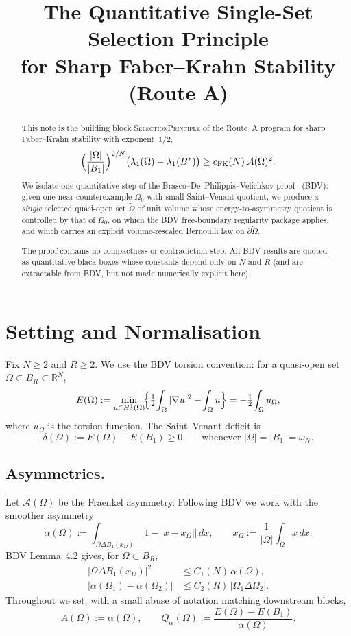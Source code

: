 \documentclass[11pt]{article}
\title{The Quantitative Single-Set Selection Principle\\for Sharp Faber--Krahn Stability (Route A)}
\author{}
\date{}
\theoremstyle{definition}
\newcommand{\R}{\mathbb{R}}
\newcommand{\wt}{\widetilde}
\newcommand{\Om}{\Omega}
\newcommand{\dx}{\,dx}
\begin{document}
\maketitle

\begin{abstract}
This note is the building block \textsc{SelectionPrinciple} of the Route~A
program for sharp Faber--Krahn stability with exponent~$1/2$,
\[
\Bigl(\frac{|\Om|}{|B_1|}\Bigr)^{2/N}
\bigl(\lambda_1(\Om)-\lambda_1(B^*)\bigr)
\ge c_{\rm FK}(N)\,\mathcal A(\Om)^2.
\]
We isolate one quantitative step of the Brasco--De~Philippis--Velichkov
proof~\cite{BDV} (BDV): given one near-counterexample $\Om_0$ with small
Saint--Venant quotient, we produce a \emph{single} selected quasi-open set
$\wt\Om$ of unit volume whose energy-to-asymmetry quotient is controlled by
that of $\Om_0$, on which the BDV free-boundary regularity package applies,
and which carries an explicit volume-rescaled Bernoulli law on
$\partial\wt\Om$.

The proof contains no compactness or contradiction step. All BDV results
are quoted as quantitative black boxes whose constants depend only on $N$
and $R$ (and are extractable from BDV, but not made numerically explicit
here).
\end{abstract}

\section{Setting and Normalisation}

Fix $N\ge2$ and $R\ge2$. We use the BDV torsion convention: for a
quasi-open set $\Om\subset B_R\subset\R^N$,
\[
E(\Om)
:=\min_{u\in H^1_0(\Om)}\!
\Bigl\{\tfrac12\!\int_\Om|\nabla u|^2-\!\int_\Om u\Bigr\}
=-\tfrac12\!\int_\Om u_\Om,
\]
where $u_\Om$ is the torsion function. The Saint--Venant deficit is
\[
\delta(\Om):=E(\Om)-E(B_1)\ge0
\qquad\text{whenever }|\Om|=|B_1|=\omega_N.
\]

\subsection*{Asymmetries.}
Let $\mathcal A(\Om)$ be the Fraenkel asymmetry. Following BDV we work with
the smoother asymmetry
\[
\alpha(\Om):=\int_{\Om\Delta B_1(x_\Om)}\bigl|1-|x-x_\Om|\bigr|\dx,
\qquad x_\Om:=\frac1{|\Om|}\!\int_\Om x\dx.
\]
BDV Lemma~4.2 gives, for $\Om\subset B_R$,
\begin{align}
|\Om\Delta B_1(x_\Om)|^2 &\le C_1(N)\,\alpha(\Om), \label{eq:42i}\\
|\alpha(\Om_1)-\alpha(\Om_2)| &\le C_2(R)\,|\Om_1\Delta\Om_2|. \label{eq:42ii}
\end{align}
Throughout we set, with a small abuse of notation matching downstream
blocks,
\[
A(\Om):=\alpha(\Om),\qquad
Q_\alpha(\Om):=\frac{E(\Om)-E(B_1)}{\alpha(\Om)}.
\]
\end{document}
